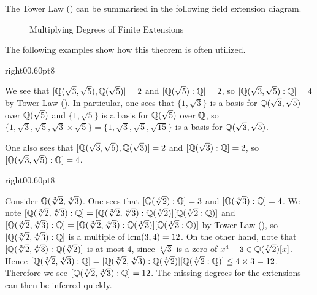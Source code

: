 The Tower Law () can be summarised in the following field extension diagram.

\begin{figure}[H]
    \centering
    \caption{Multiplying Degrees of Finite Extensions}
\end{figure}

The following examples show how this theorem is often utilized.

\begin{examplewithcutout}{right}{0}{0.6\textwidth}{0pt}{8}{
    \begin{figure}[H]
        \centering
    \end{figure}
}\label{example-Q-sqrt3-sqrt5}
    We see that $[\mathbb{Q}(\sqrt3, \sqrt5), \mathbb{Q}(\sqrt5)] = 2$ and $[\mathbb{Q}(\sqrt5):\mathbb{Q}] = 2$, so $[\mathbb{Q}(\sqrt3, \sqrt5):\mathbb{Q}] = 4$ by Tower Law (). In particular, one sees that $\{1, \sqrt3\}$ is a basis for $\mathbb{Q}(\sqrt3,\sqrt5)$ over $\mathbb{Q}(\sqrt5)$ and $\{1, \sqrt5\}$ is a basis for $\mathbb{Q}(\sqrt5)$ over $\mathbb{Q}$, so $\{1, \sqrt3, \sqrt5, \sqrt3\times\sqrt5\} = \{1, \sqrt3, \sqrt5, \sqrt{15}\}$ is a basis for $\mathbb{Q}(\sqrt3, \sqrt5)$.

    One also sees that $[\mathbb{Q}(\sqrt3, \sqrt5), \mathbb{Q}(\sqrt3)] = 2$ and $[\mathbb{Q}(\sqrt3):\mathbb{Q}] = 2$, so $[\mathbb{Q}(\sqrt3, \sqrt5):\mathbb{Q}] = 4$.
\end{examplewithcutout}

\begin{examplewithcutout}{right}{0}{0.6\textwidth}{0pt}{8}{
    \begin{figure}[H]
        \centering
    \end{figure}
}
    Consider $\mathbb{Q}(\sqrt[3]2, \sqrt[4]3)$. One sees that $[\mathbb{Q}(\sqrt[3]2):\mathbb{Q}] = 3$ and $[\mathbb{Q}(\sqrt[4]3):\mathbb{Q}] = 4$. We note $[\mathbb{Q}(\sqrt[3]2, \sqrt[4]3):\mathbb{Q}] = [\mathbb{Q}(\sqrt[3]2, \sqrt[4]3):\mathbb{Q}(\sqrt[3]2)][\mathbb{Q}(\sqrt[3]2:\mathbb{Q})]$ and $[\mathbb{Q}(\sqrt[3]2, \sqrt[4]3):\mathbb{Q}] = [\mathbb{Q}(\sqrt[3]2, \sqrt[4]3):\mathbb{Q}(\sqrt[4]3)][\mathbb{Q}(\sqrt[4]3:\mathbb{Q})]$ by Tower Law (), so $[\mathbb{Q}(\sqrt[3]2, \sqrt[4]3):\mathbb{Q}]$ is a multiple of $\mathrm{lcm}(3, 4) = 12$. On the other hand, note that $[\mathbb{Q}(\sqrt[3]2, \sqrt[4]3):\mathbb{Q}(\sqrt[3]2)]$ is at most 4, since $\sqrt[4]3$ is a zero of $x^4 - 3 \in \mathbb{Q}(\sqrt[3]2)[x]$. Hence $[\mathbb{Q}(\sqrt[3]2, \sqrt[4]3):\mathbb{Q}] = [\mathbb{Q}(\sqrt[3]2, \sqrt[4]3):\mathbb{Q}(\sqrt[3]2)][\mathbb{Q}(\sqrt[3]2:\mathbb{Q})] \leq 4 \times 3 = 12$. Therefore we see $[\mathbb{Q}(\sqrt[3]2, \sqrt[4]3):\mathbb{Q}] = 12$. The missing degrees for the extensions can then be inferred quickly.
\end{examplewithcutout}


